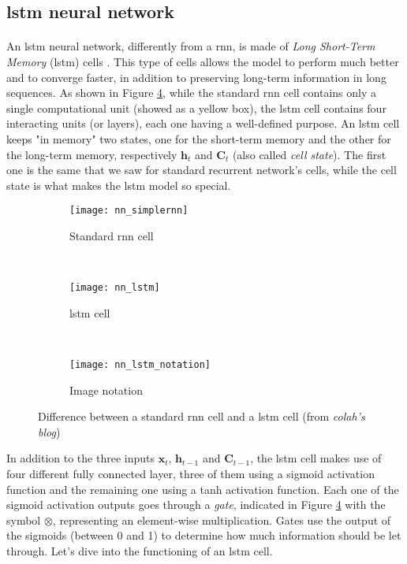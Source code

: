 \subsection{\acs{lstm} neural network}
\paragraph{} An \acs{lstm} neural network, differently from a \acs{rnn}, is made of \textit{Long Short-Term Memory} (\acs{lstm}) cells \cite{NeuralComputation:lstm}. This type of cells allows the model to perform much better and to converge faster, in addition to preserving long-term information in long sequences. As shown in Figure \ref{fig:rnn_vs_lstm}, while the standard \acs{rnn} cell contains only a single computational unit (showed as a yellow box), the \acs{lstm} cell contains four interacting units (or layers), each one having a well-defined purpose. An \acs{lstm} cell keeps "in memory" two states, one for the short-term memory and the other for the long-term memory, respectively $\mathbf{h}_t$ and $\mathbf{C}_t$ (also called \textit{cell state}). The first one is the same that we saw for standard recurrent network's cells, while the cell state is what makes the \acs{lstm} model so special.
\begin{figure}[t]
    \centering
    \begin{subfigure}[t]{0.8\textwidth}
		\texttt{[image: nn\_simplernn]}
        \caption{Standard \acs{rnn} cell}
        \label{fig:nn_simplernn}
	\end{subfigure}
	~
	\begin{subfigure}[t]{0.8\textwidth}
		\texttt{[image: nn\_lstm]}
        \caption{\acs{lstm} cell}
        \label{fig:nn_lstm}
    \end{subfigure}
    ~
    \begin{subfigure}[t]{0.6\textwidth}
		\texttt{[image: nn\_lstm\_notation]}
        \caption{Image notation}
        \label{fig:nn_lstm_notation}
	\end{subfigure}
    \caption{Difference between a standard \acs{rnn} cell and a \acs{lstm} cell (from \textit{colah's blog})}
    \label{fig:rnn_vs_lstm}
\end{figure}

In addition to the three inputs $\mathbf{x}_t$, $\mathbf{h}_{t-1}$ and $\mathbf{C}_{t-1}$, the \acs{lstm} cell makes use of four different fully connected layer, three of them using a sigmoid activation function and the remaining one using a \acs{tanh} activation function. Each one of the sigmoid activation outputs goes through a \textit{gate}, indicated in Figure \ref{fig:rnn_vs_lstm} with the symbol $\otimes$, representing an element-wise multiplication. Gates use the output of the sigmoids (between 0 and 1) to determine how much information should be let through. Let's dive into the functioning of an \acs{lstm} cell.

